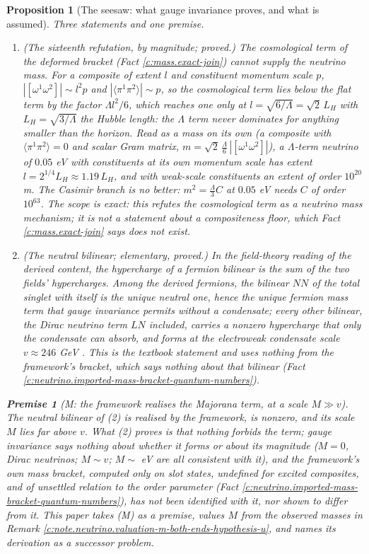 \documentclass[11pt]{article}
\newtheorem{proposition}[theorem]{Proposition}
\theoremstyle{definition}
\newtheorem{premise}[theorem]{Premise}
\theoremstyle{plain}
\newcommand{\changedmark}[2]{\marginpar{\raggedright\scriptsize\color{#1}#2}}
\providecommand{\LH}{}\renewcommand{\LH}{L_{H}}
\providecommand{\br}{}\renewcommand{\br}[1]{\langle #1\rangle}
\begin{document}
\begin{proposition}[The seesaw: what gauge invariance proves, and what is assumed]\label{c:neutrino.seesaw-what-gauge-invariance-proves-what}
\changedmark{gray}{reworded}
Three statements and one premise.
\begin{enumerate}
\item \emph{(The sixteenth refutation, by magnitude; proved.)} The cosmological term of the deformed bracket (Fact \ref{c:mass.exact-join}) cannot supply the neutrino mass. For a composite of extent $l$ and constituent momentum scale $p$, $|[\omega^{1}\omega^{2}]| \sim l^{2}p$ and $|\br{\pi^{1}\pi^{2}}| \sim p$, so the cosmological term lies below the flat term by the factor $\Lambda l^{2}/6$, which reaches one only at $l = \sqrt{6/\Lambda} = \sqrt{2}\,\LH$ with $\LH = \sqrt{3/\Lambda}$ the Hubble length: the $\Lambda$ term never dominates for anything smaller than the horizon. Read as a mass on its own (a composite with $\br{\pi^{1}\pi^{2}} = 0$ and scalar Gram matrix, $m = \sqrt{2}\,\tfrac{\Lambda}{6}\,|[\omega^{1}\omega^{2}]|$), a $\Lambda$-term neutrino of $0.05$ eV with constituents at its own momentum scale has extent $l = 2^{1/4}\LH \approx 1.19\,\LH$, and with weak-scale constituents an extent of order $10^{20}$ m. The Casimir branch is no better: $m^{2} = \tfrac{\Lambda}{3}C$ at $0.05$ eV needs $C$ of order $10^{63}$. The scope is exact: this refutes the cosmological term as a neutrino mass mechanism; it is not a statement about a compositeness floor, which Fact \ref{c:mass.exact-join} says does not exist.
\item \emph{(The neutral bilinear; elementary, proved.)} In the field-theory reading of the derived content, the hypercharge of a fermion bilinear is the sum of the two fields' hypercharges. Among the derived fermions, the bilinear $N N$ of the total singlet with itself is the unique neutral one, hence the unique fermion mass term that gauge invariance permits without a condensate; every other bilinear, the Dirac neutrino term $L N$ included, carries a nonzero hypercharge that only the condensate can absorb, and forms at the electroweak condensate scale $v \approx 246$ GeV \cite{PDG2024}. This is the textbook statement and uses nothing from the framework's bracket, which says nothing about that bilinear (Fact \ref{c:neutrino.imported-mass-bracket-quantum-numbers}).
\end{enumerate}
\begin{premise}[M: the framework realises the Majorana term, at a scale $M \gg v$]
The neutral bilinear of (2) is realised by the framework, is nonzero, and its scale $M$ lies far above $v$. What (2) proves is that nothing forbids the term; gauge invariance says nothing about whether it forms or about its magnitude ($M = 0$, Dirac neutrinos; $M \sim v$; $M \sim$ eV are all consistent with it), and the framework's own mass bracket, computed only on slot states, undefined for excited composites, and of unsettled relation to the order parameter (Fact \ref{c:neutrino.imported-mass-bracket-quantum-numbers}), has not been identified with it, nor shown to differ from it. This paper takes (M) as a premise, values $M$ from the observed masses in Remark \ref{c:note.neutrino.valuation-m-both-ends-hypothesis-u}, and names its derivation as a successor problem.

\end{premise}
\end{proposition}
\end{document}
